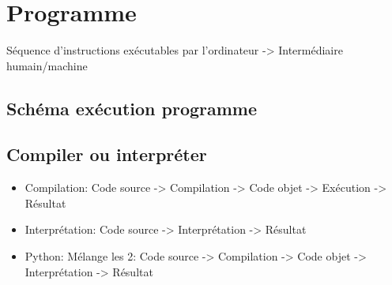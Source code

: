 \section{Programme}
Séquence d'instructions exécutables par l'ordinateur -> Intermédiaire humain/machine
  \subsection{Schéma exécution programme}
  \subsection{Compiler ou interpréter}
  \begin{itemize}
    \item Compilation: Code source -> Compilation -> Code objet -> Exécution -> Résultat
    \item Interprétation: Code source -> Interprétation -> Résultat
    \item Python: Mélange les 2: Code source -> Compilation -> Code objet -> Interprétation -> Résultat
  \end{itemize}
